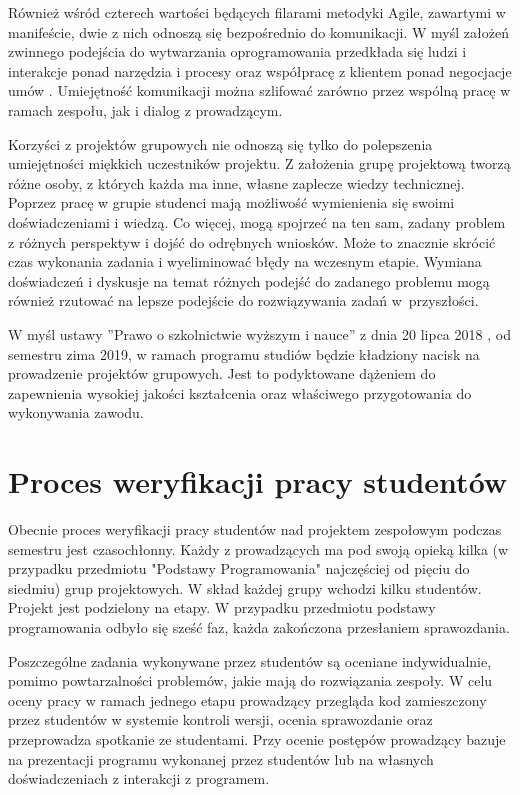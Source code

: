 Również wśród czterech wartości będących filarami metodyki Agile, zawartymi w manifeście, dwie z nich odnoszą się bezpośrednio do komunikacji.
W myśl założeń zwinnego podejścia do wytwarzania oprogramowania przedkłada się ludzi i interakcje ponad narzędzia i procesy oraz współpracę z klientem ponad negocjacje umów \cite{agile-manifesto}.
Umiejętność komunikacji można szlifować zarówno przez wspólną pracę w ramach zespołu, jak i dialog z prowadzącym.

Korzyści z projektów grupowych nie odnoszą się tylko do polepszenia umiejętności miękkich uczestników projektu.
Z założenia grupę projektową tworzą różne osoby, z których każda ma inne, własne zaplecze wiedzy technicznej.
Poprzez pracę w grupie studenci mają możliwość wymienienia się swoimi doświadczeniami i wiedzą.
Co więcej, mogą spojrzeć na ten sam, zadany problem z różnych perspektyw i dojść do odrębnych wniosków.
Może to znacznie skrócić czas wykonania zadania i wyeliminować błędy na wczesnym etapie. 
Wymiana doświadczeń i dyskusje na temat różnych podejść do zadanego problemu mogą również rzutować na lepsze podejście do rozwiązywania zadań w~przyszłości.

W myśl ustawy ”Prawo o szkolnictwie wyższym i nauce” z dnia 20 lipca 2018 \cite{higher-education-law}, od semestru zima 2019, w ramach programu studiów będzie kładziony nacisk na prowadzenie projektów grupowych.
Jest to podyktowane dążeniem do zapewnienia wysokiej jakości kształcenia oraz właściwego przygotowania do wykonywania zawodu.

\vfill

\section{Proces weryfikacji pracy studentów}

Obecnie proces weryfikacji pracy studentów nad projektem zespołowym podczas semestru jest czasochłonny.
Każdy z prowadzących ma pod swoją opieką kilka (w przypadku przedmiotu "Podstawy Programowania" najczęściej od pięciu do siedmiu) grup projektowych.
W skład każdej grupy wchodzi kilku studentów.
Projekt jest podzielony na etapy. 
W przypadku przedmiotu podstawy programowania odbyło się sześć faz, każda zakończona przesłaniem sprawozdania.

Poszczególne zadania wykonywane przez studentów są oceniane indywidualnie, pomimo powtarzalności problemów, jakie mają do rozwiązania zespoły.
W celu oceny pracy w ramach jednego etapu prowadzący przegląda kod zamieszczony przez studentów w systemie kontroli wersji, ocenia sprawozdanie oraz przeprowadza spotkanie ze studentami.
Przy ocenie postępów prowadzący bazuje na prezentacji programu wykonanej przez studentów lub na własnych doświadczeniach z interakcji z programem.

